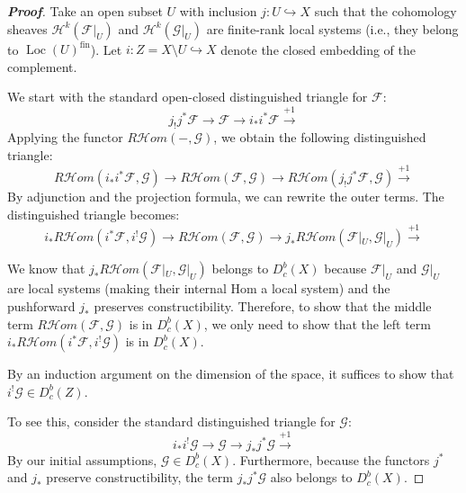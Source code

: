 \begin{proof}[\textbf{Proof}]
Take an open subset $U$ with inclusion $j \colon U \hookrightarrow X$ such that the cohomology sheaves $\mathcal{H}^k(\mathcal{F}|_U)$ and $\mathcal{H}^k(\mathcal{G}|_U)$ are finite-rank local systems (i.e., they belong to $\operatorname{Loc}(U)^{\text{fin}}$). Let $i \colon Z = X \setminus U \hookrightarrow X$ denote the closed embedding of the complement. 

We start with the standard open-closed distinguished triangle for $\mathcal{F}$:
\begin{equation*}
    j_! j^* \mathcal{F} \longrightarrow \mathcal{F} \longrightarrow i_* i^* \mathcal{F} \xrightarrow{+1}
\end{equation*}
Applying the functor $R\mathcal{H}om(-, \mathcal{G})$, we obtain the following distinguished triangle:
\begin{equation*}
    R\mathcal{H}om(i_* i^* \mathcal{F}, \mathcal{G}) \longrightarrow R\mathcal{H}om(\mathcal{F}, \mathcal{G}) \longrightarrow R\mathcal{H}om(j_! j^* \mathcal{F}, \mathcal{G}) \xrightarrow{+1}
\end{equation*}
By adjunction and the projection formula, we can rewrite the outer terms. The distinguished triangle becomes:
\begin{equation*}
    i_* R\mathcal{H}om(i^* \mathcal{F}, i^! \mathcal{G}) \longrightarrow R\mathcal{H}om(\mathcal{F}, \mathcal{G}) \longrightarrow j_* R\mathcal{H}om(\mathcal{F}|_U, \mathcal{G}|_U) \xrightarrow{+1}
\end{equation*}

We know that $j_* R\mathcal{H}om(\mathcal{F}|_U, \mathcal{G}|_U)$ belongs to $D^b_c(X)$ because $\mathcal{F}|_U$ and $\mathcal{G}|_U$ are local systems (making their internal Hom a local system) and the pushforward $j_*$ preserves constructibility. Therefore, to show that the middle term $R\mathcal{H}om(\mathcal{F}, \mathcal{G})$ is in $D^b_c(X)$, we only need to show that the left term $i_* R\mathcal{H}om(i^* \mathcal{F}, i^! \mathcal{G})$ is in $D^b_c(X)$.

By an induction argument on the dimension of the space, it suffices to show that $i^! \mathcal{G} \in D^b_c(Z)$.

To see this, consider the standard distinguished triangle for $\mathcal{G}$:
\begin{equation*}
    i_* i^! \mathcal{G} \longrightarrow \mathcal{G} \longrightarrow j_* j^* \mathcal{G} \xrightarrow{+1}
\end{equation*}
By our initial assumptions, $\mathcal{G} \in D^b_c(X)$. Furthermore, because the functors $j^*$ and $j_*$ preserve constructibility, the term $j_* j^* \mathcal{G}$ also belongs to $D^b_c(X)$. 


\end{proof}
